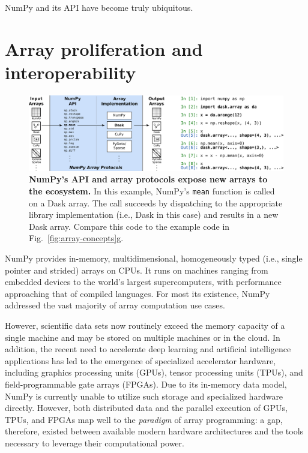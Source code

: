 \documentclass[twocolumn]{article}
\begin{document}
NumPy and its API have become truly ubiquitous.

\section*{Array proliferation and interoperability}

\begin{figure}
  \centering
  \includegraphics[width=\textwidth]{protocol}

  \caption{\textbf{NumPy's API and array protocols expose new arrays to the ecosystem.}
     In this example, NumPy's \texttt{mean} function is called on a Dask
     array.  The call succeeds by dispatching to the appropriate library implementation
     (i.e., Dask in this case) and results in a new Dask array.  Compare this
     code to the example code in Fig.~\ref{fig:array-concepts}g.
  }\label{fig:array-protocol}

\end{figure}

NumPy provides in-memory, multidimensional, homogeneously typed
(i.e., single pointer and strided) arrays on CPUs.  It runs on machines
ranging from embedded devices to the world's largest supercomputers,
with performance approaching that of compiled languages.
For most its existence, NumPy addressed the vast majority of
array computation use cases.

However, scientific data sets now routinely exceed the memory capacity of a single machine and may
be stored on multiple machines or in the cloud.
In addition, the recent need to accelerate deep learning and artificial intelligence applications
has led to the emergence of specialized accelerator hardware,
including graphics processing units (GPUs), tensor processing units (TPUs),
and field-programmable gate arrays (FPGAs).
Due to its in-memory data model, NumPy is currently unable to
utilize such storage and specialized hardware directly.  However, both
distributed data and the parallel execution of GPUs, TPUs, and FPGAs map well
to the \emph{paradigm} of array programming: a gap, therefore, existed between
available modern hardware architectures and the tools necessary to
leverage their computational power.
\end{document}
